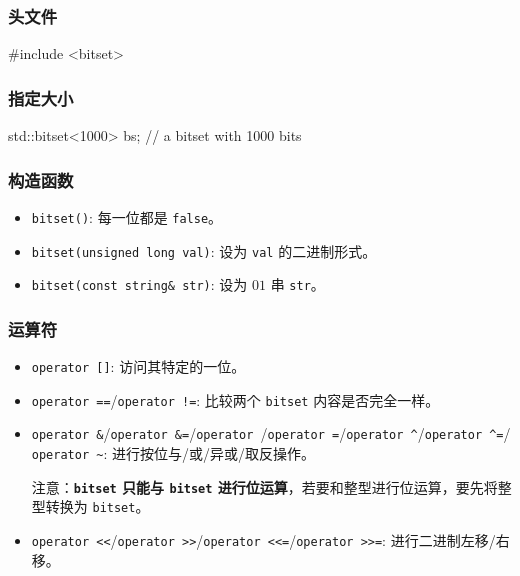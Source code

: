 \subsubsection{头文件}\label{ux5934ux6587ux4ef6-3}


\begin{codeline}
#include <bitset>
\end{codeline}


\subsubsection{指定大小}\label{ux6307ux5b9aux5927ux5c0f}


\begin{codeline}
std::bitset<1000> bs;  // a bitset with 1000 bits
\end{codeline}


\subsubsection{构造函数}\label{ux6784ux9020ux51fdux6570-2}

\begin{itemize}
\tightlist
\item
  \texttt{bitset()}: 每一位都是 \texttt{false}。
\item
  \texttt{bitset(unsigned\ long\ val)}: 设为 \texttt{val} 的二进制形式。
\item
  \texttt{bitset(const\ string\&\ str)}: 设为 \(01\) 串 \texttt{str}。
\end{itemize}

\subsubsection{运算符}\label{ux8fd0ux7b97ux7b26}

\begin{itemize}
\item
  \texttt{operator\ {[}{]}}: 访问其特定的一位。
\item
  \texttt{operator\ ==}/\texttt{operator\ !=}: 比较两个 \texttt{bitset} 内容是否完全一样。
\item
  \texttt{operator\ \&}/\texttt{operator\ \&=}/\texttt{operator\ \textbar{}}/\texttt{operator\ \textbar{}=}/\texttt{operator\ \^{}}/\texttt{operator\ \^{}=}/\texttt{operator\ \textasciitilde{}}: 进行按位与/或/异或/取反操作。

  注意：\textbf{\texttt{bitset} 只能与 \texttt{bitset} 进行位运算}，若要和整型进行位运算，要先将整型转换为 \texttt{bitset}。
\item
  \texttt{operator\ \textless{}\textless{}}/\texttt{operator\ \textgreater{}\textgreater{}}/\texttt{operator\ \textless{}\textless{}=}/\texttt{operator\ \textgreater{}\textgreater{}=}: 进行二进制左移/右移。
\end{itemize}

